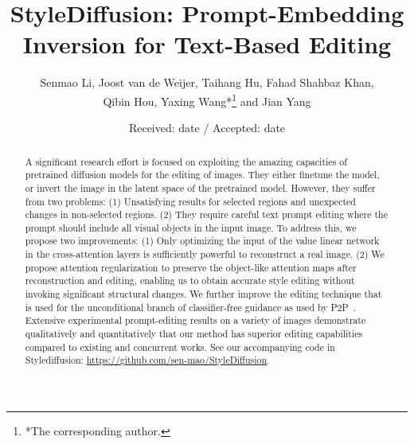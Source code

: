 \documentclass[twocolumn]{svjour3}          \smartqed  \usepackage{graphicx}
\begin{document}
\sloppy
\title{StyleDiffusion: Prompt-Embedding Inversion for Text-Based Editing}


\author{Senmao Li,
        Joost van de Weijer, Taihang Hu,
        Fahad Shahbaz Khan, \\
        Qibin Hou, Yaxing Wang*\thanks{*The corresponding author.} and Jian Yang
}




\date{Received: date / Accepted: date}

\maketitle

\begin{abstract}
A significant research effort is focused on exploiting the amazing capacities of pretrained diffusion models for the editing of images.
They either finetune the model, or invert the image in the latent space of the pretrained model. However, they suffer from two problems: (1) Unsatisfying results for selected regions and unexpected changes in non-selected regions.
    (2) They require careful text prompt editing where the prompt should include all visual objects in the input image.
To address this, we propose two improvements: 
(1) Only optimizing the input of the value linear network in the cross-attention layers is sufficiently powerful to reconstruct a real image. (2) We propose attention regularization to preserve the object-like attention maps after reconstruction and editing, enabling us to obtain accurate style editing without invoking significant structural changes.
We further improve the editing technique that is used for the unconditional branch of classifier-free guidance as used by P2P~\citep{hertz2022prompt}. Extensive experimental prompt-editing results on a variety of images demonstrate qualitatively and quantitatively that our method has superior editing capabilities compared to existing and concurrent works. See our accompanying code in  Stylediffusion: \url{https://github.com/sen-mao/StyleDiffusion}.
\end{abstract}
\end{document}
